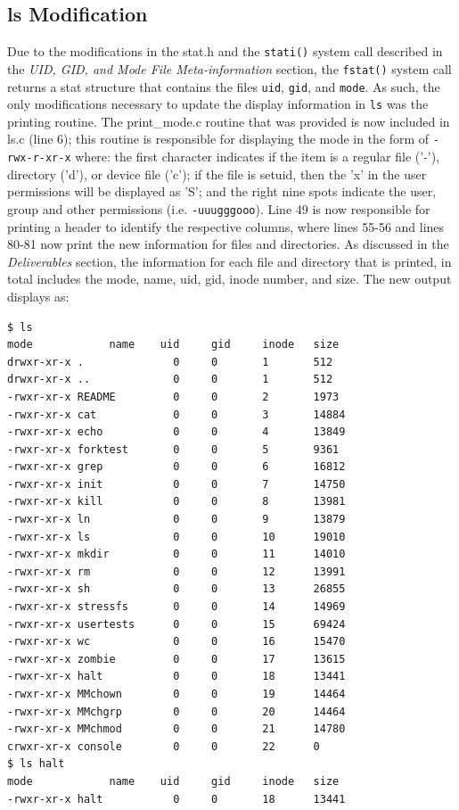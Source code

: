 \documentclass[11pt,letterpaper]{report}
\begin{document}
	\subsection*{ls Modification}
	Due to the modifications in the stat.h and the {\tt stati()} system call described in the \emph{UID, GID, and Mode File Meta-information} section, the {\tt fstat()} system call returns a stat structure that contains the files
	{\tt uid}, {\tt gid}, and {\tt mode}. As such, the only modifications necessary to update the display information in {\tt ls} was the printing routine. The print\_mode.c routine that was provided is now included in ls.c (line 6); 
	 this routine is responsible for displaying the mode in the form of {\tt -rwx-r-xr-x} where: the first character indicates if the item is a regular file ('-'), directory ('d'), or device file ('c'); if the file is setuid, then the 'x' in the 
	 user permissions will be displayed as 'S'; and the right nine spots indicate the user, group and other permissions (i.e. {\tt -uuugggooo}). Line 49 is now responsible for printing a header to identify the respective columns, where
	 lines 55-56 and lines 80-81 now print the new information for files and directories. As discussed in the \emph{Deliverables} section, the information for each file and directory that is printed, in total includes the mode, name, 
	 uid, gid, inode number, and size. The new output displays as:
	 
	  \noindent
\begin{lstlisting}
$ ls
mode            name    uid     gid     inode   size
drwxr-xr-x .              0     0       1       512
drwxr-xr-x ..             0     0       1       512
-rwxr-xr-x README         0     0       2       1973
-rwxr-xr-x cat            0     0       3       14884
-rwxr-xr-x echo           0     0       4       13849
-rwxr-xr-x forktest       0     0       5       9361
-rwxr-xr-x grep           0     0       6       16812
-rwxr-xr-x init           0     0       7       14750
-rwxr-xr-x kill           0     0       8       13981
-rwxr-xr-x ln             0     0       9       13879
-rwxr-xr-x ls             0     0       10      19010
-rwxr-xr-x mkdir          0     0       11      14010
-rwxr-xr-x rm             0     0       12      13991
-rwxr-xr-x sh             0     0       13      26855
-rwxr-xr-x stressfs       0     0       14      14969
-rwxr-xr-x usertests      0     0       15      69424
-rwxr-xr-x wc             0     0       16      15470
-rwxr-xr-x zombie         0     0       17      13615
-rwxr-xr-x halt           0     0       18      13441
-rwxr-xr-x MMchown        0     0       19      14464
-rwxr-xr-x MMchgrp        0     0       20      14464
-rwxr-xr-x MMchmod        0     0       21      14780
crwxr-xr-x console        0     0       22      0
$ ls halt
mode            name    uid     gid     inode   size
-rwxr-xr-x halt           0     0       18      13441
\end{lstlisting}	
\end{document}

